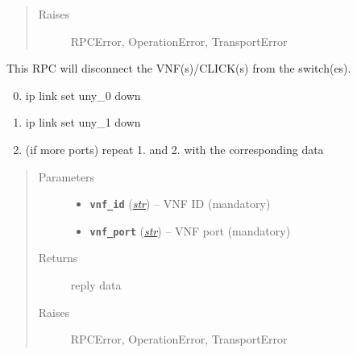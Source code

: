 \documentclass[letterpaper,10pt,english]{sphinxmanual}
\begin{document}
\begin{fulllineitems}
\begin{fulllineitems}
\begin{quote}
\begin{description}
\item[{Raises}] \leavevmode
RPCError, OperationError, TransportError

\end{description}\end{quote}

\end{fulllineitems}


\begin{fulllineitems}
\label{adapt/domain_adapters:escape.adapt.domain_adapters.VNFStarterAdapter.disconnectVNF}
This RPC will disconnect the VNF(s)/CLICK(s) from the switch(es).
\begin{enumerate}
\setcounter{enumi}{-1}
\item {} 
ip link set uny\_0 down

\item {} 
ip link set uny\_1 down

\item {} 
(if more ports) repeat 1. and 2. with the corresponding data

\end{enumerate}
\begin{quote}\begin{description}
\item[{Parameters}] \leavevmode\begin{itemize}
\item {} 
\textbf{\texttt{vnf\_id}} (\href{https://docs.python.org/2.7/library/functions.html\#str}{\emph{str}}) -- VNF ID (mandatory)

\item {} 
\textbf{\texttt{vnf\_port}} (\href{https://docs.python.org/2.7/library/functions.html\#str}{\emph{str}}) -- VNF port (mandatory)

\end{itemize}

\item[{Returns}] \leavevmode
reply data

\item[{Raises}] \leavevmode
RPCError, OperationError, TransportError

\end{description}\end{quote}

\end{fulllineitems}


\end{fulllineitems}
\end{document}
